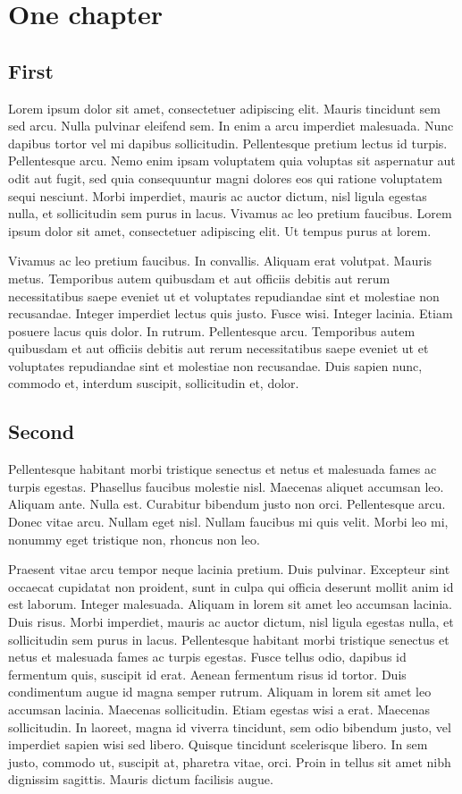 \chapter{One chapter}
\section{First}
Lorem ipsum dolor sit amet, consectetuer adipiscing elit. Mauris tincidunt sem sed arcu. Nulla pulvinar eleifend sem. In enim a arcu imperdiet malesuada. Nunc dapibus tortor vel mi dapibus sollicitudin. Pellentesque pretium lectus id turpis. Pellentesque arcu. Nemo enim ipsam voluptatem quia voluptas sit aspernatur aut odit aut fugit, sed quia consequuntur magni dolores eos qui ratione voluptatem sequi nesciunt. Morbi imperdiet, mauris ac auctor dictum, nisl ligula egestas nulla, et sollicitudin sem purus in lacus. Vivamus ac leo pretium faucibus. Lorem ipsum dolor sit amet, consectetuer adipiscing elit. Ut tempus purus at lorem.

Vivamus ac leo pretium faucibus. In convallis. Aliquam erat volutpat. Mauris metus. Temporibus autem quibusdam et aut officiis debitis aut rerum necessitatibus saepe eveniet ut et voluptates repudiandae sint et molestiae non recusandae. Integer imperdiet lectus quis justo. Fusce wisi. Integer lacinia. Etiam posuere lacus quis dolor. In rutrum. Pellentesque arcu. Temporibus autem quibusdam et aut officiis debitis aut rerum necessitatibus saepe eveniet ut et voluptates repudiandae sint et molestiae non recusandae. Duis sapien nunc, commodo et, interdum suscipit, sollicitudin et, dolor.

\section{Second}
Pellentesque habitant morbi tristique senectus et netus et malesuada fames ac turpis egestas. Phasellus faucibus molestie nisl. Maecenas aliquet accumsan leo. Aliquam ante. Nulla est. Curabitur bibendum justo non orci. Pellentesque arcu. Donec vitae arcu. Nullam eget nisl. Nullam faucibus mi quis velit. Morbi leo mi, nonummy eget tristique non, rhoncus non leo.

Praesent vitae arcu tempor neque lacinia pretium. Duis pulvinar. Excepteur sint occaecat cupidatat non proident, sunt in culpa qui officia deserunt mollit anim id est laborum. Integer malesuada. Aliquam in lorem sit amet leo accumsan lacinia. Duis risus. Morbi imperdiet, mauris ac auctor dictum, nisl ligula egestas nulla, et sollicitudin sem purus in lacus. Pellentesque habitant morbi tristique senectus et netus et malesuada fames ac turpis egestas. Fusce tellus odio, dapibus id fermentum quis, suscipit id erat. Aenean fermentum risus id tortor. Duis condimentum augue id magna semper rutrum. Aliquam in lorem sit amet leo accumsan lacinia. Maecenas sollicitudin. Etiam egestas wisi a erat. Maecenas sollicitudin. In laoreet, magna id viverra tincidunt, sem odio bibendum justo, vel imperdiet sapien wisi sed libero. Quisque tincidunt scelerisque libero. In sem justo, commodo ut, suscipit at, pharetra vitae, orci. Proin in tellus sit amet nibh dignissim sagittis. Mauris dictum facilisis augue.
